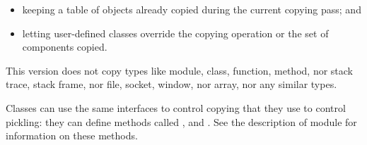 \begin{itemize}

\item
keeping a table of objects already copied during the current
copying pass; and

\item
letting user-defined classes override the copying operation or the
set of components copied.

\end{itemize}

This version does not copy types like module, class, function, method,
nor stack trace, stack frame, nor file, socket, window, nor array, nor
any similar types.

Classes can use the same interfaces to control copying that they use
to control pickling: they can define methods called
,  and
.  See the description of module 
for information on these methods.
\renewcommand{\indexsubitem}{(copy protocol)}
